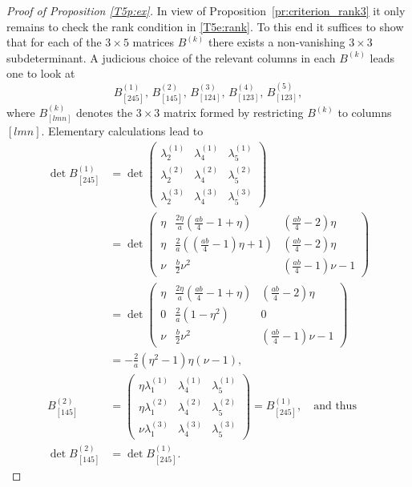 \documentclass[titlepage]{amsart}
\numberwithin{equation}{section}
\theoremstyle{plain}
\theoremstyle{definition}
\theoremstyle{remark}
\begin{document}
\begin{proof}[Proof of Proposition \ref{T5p:ex}]
In view of Proposition~\ref{pr:criterion_rank3} it only
  remains to check the rank condition in \eqref{T5e:rank}. To this end it suffices to show that for each of the $3\times 5$ matrices $B^{(k)}$ there exists a non-vanishing $3\times 3$ subdeterminant. A judicious choice of the relevant columns in each $B^{(k)}$ leads one to look at 
$$
B^{(1)}_{[2 4 5]},\,B^{(2)}_{[1 4 5]},\,
 B^{(3)}_{[124]},\,
B^{(4)}_{[1 2 3]},\,B^{(5)}_{[1 2 3]},
$$
where $B^{(k)}_{[l m n]}$ denotes the $3\times 3$ matrix formed by restricting $B^{(k)}$ to columns $[l m n ]$. 
Elementary calculations lead to
\begin{align*}
\det B^{(1)}_{[2 4 5]} 
&
 = \det \begin{pmatrix} \lambda^{(1)}_2   &  \lambda^{(1)}_4 & \lambda^{(1)}_5 \\
  \lambda^{(2)}_2 &  \lambda^{(2)}_4 & \lambda^{(2)}_5\\
   \lambda^{(3)}_2   &  \lambda^{(3)}_4 & \lambda^{(3)}_5
\end{pmatrix}
\\
 &= \det \begin{pmatrix}
	\eta &\tfrac{2\eta}{a}\left(\tfrac{ab}{4}-1+\eta\right)&\left(\frac{ab}{4}-2\right)\eta\\
    \eta &\tfrac{2}{a}\left((\tfrac{ab}{4}-1)\eta+1\right)&\left(\frac{ab}{4}-2\right)\eta\\
    \nu &\tfrac{b}{2}\nu^2&\left(\frac{ab}{4}-1\right)\nu-1
\end{pmatrix}\\
&=\det\begin{pmatrix}
	\eta &\tfrac{2\eta}{a}\left(\tfrac{ab}{4}-1+\eta\right)&\left(\frac{ab}{4}-2\right)\eta\\
    0 &\tfrac{2}{a}\left(1-\eta^2\right)&0\\
    \nu &\tfrac{b}{2}\nu^2&\left(\frac{ab}{4}-1\right)\nu-1
\end{pmatrix}\\
&=-\tfrac{2}{a}(\eta^2-1)\eta(\nu-1),\\
  B^{(2)}_{[1 4 5]} 
 & =
 \begin{pmatrix} \eta \lambda^{(1)}_1 &  \lambda^{(1)}_4 & \lambda^{(1)}_5 \\
\eta  \lambda^{(2)}_1 &  \lambda^{(2)}_4 & \lambda^{(2)}_5\\
 \nu   \lambda^{(3)}_1 &   \lambda^{(3)}_4 & \lambda^{(3)}_5
\end{pmatrix}  
=  B^{(1)}_{[245]},  \quad  \text{and thus}  \\
\det   B^{(2)}_{[1 4 5]} & = \det  B^{(1)}_{[245]}.
 \end{align*}
 


\end{proof}
\end{document}
